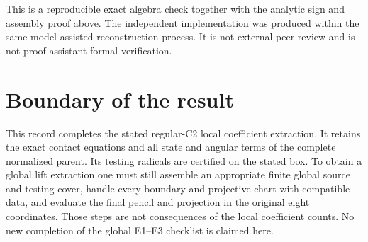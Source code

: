 \documentclass[11pt]{article}
\theoremstyle{definition}
\begin{document}
This is a reproducible exact algebra check together with the analytic sign
and assembly proof above. The independent implementation was produced within
the same model-assisted reconstruction process. It is not external peer
review and is not proof-assistant formal verification.

\section{Boundary of the result}

This record completes the stated regular-C2 local coefficient extraction. It
retains the exact contact equations and all state and angular terms of the
complete normalized parent. Its testing radicals are certified on the stated
box. To obtain a global lift extraction one must still assemble an appropriate
finite global source and testing cover, handle every boundary and projective
chart with compatible data, and evaluate the final pencil and projection in
the original eight coordinates. Those steps are not consequences of the
local coefficient counts. No new completion of the global E1--E3 checklist
is claimed here.
\end{document}
